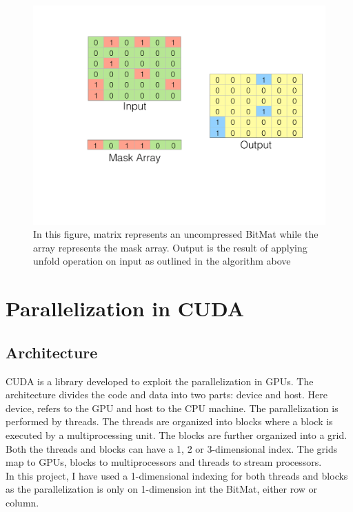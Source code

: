 \documentclass{article}
\begin{document}
\begin{figure}[ht]
        \includegraphics[width=\textwidth]{AND.pdf}
        \caption{In this figure, matrix represents an uncompressed BitMat while the array represents the mask array. Output is the result of applying unfold operation on input as outlined in the algorithm above}
        \centering
\end{figure}

\section*{Parallelization in CUDA}
\subsection*{Architecture}
CUDA is a library developed to exploit the parallelization in GPUs. The architecture divides the code and data into two parts: device and host. Here device, refers to the GPU and host to the CPU machine. The parallelization is performed by threads. The threads are organized into blocks where a block is executed by a multiprocessing unit. The blocks are further organized into a grid. Both the threads and blocks can have a 1, 2 or 3-dimensional index. The grids map to GPUs, blocks to multiprocessors and threads to stream processors.\\

In this project, I have used a 1-dimensional indexing for both threads and blocks as the parallelization is only on 1-dimension int the BitMat, either row or column.
\end{document}
